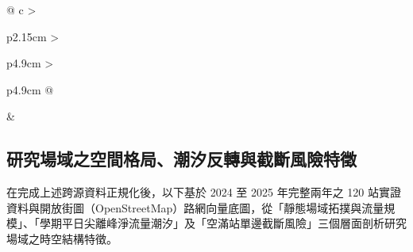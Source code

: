 \begin{table}[htbp]
\begin{tabular}{@{} c >{\raggedright\arraybackslash}p{2.15cm} >{\raggedright\arraybackslash}p{4.9cm} >{\raggedright\arraybackslash}p{4.9cm} @{}}
\midrule
{} &  \\
\bottomrule
\end{tabular}
\end{table}
\FloatBarrier

\subsection{研究場域之空間格局、潮汐反轉與截斷風險特徵}\label{subsec:spatiotemporal_features}

在完成上述跨源資料正規化後，以下基於 2024 至 2025 年完整兩年之 120 站實證資料與開放街圖（OpenStreetMap）路網向量底圖，從「靜態場域拓撲與流量規模」、「學期平日尖離峰淨流量潮汐」及「空滿站單邊截斷風險」三個層面剖析研究場域之時空結構特徵。

